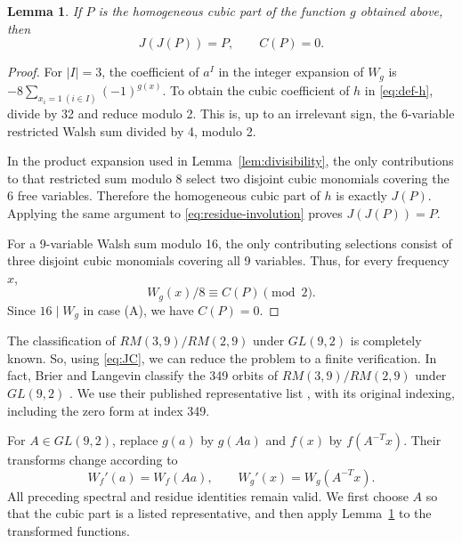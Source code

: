 \documentclass[11pt]{article}
\newtheorem{lemma}{Lemma}
\newtheorem{open problem}{Open problem}
\begin{document}
\begin{lemma}\label{lem:JC}
If $P$ is the homogeneous cubic part of the function $g$ obtained above, then
\begin{equation}\label{eq:JC}
J(J(P))=P,\qquad C(P)=0.
\end{equation}
\end{lemma}
\begin{proof}
For $|I|=3$, the coefficient of $a^I$ in the integer expansion of $W_g$ is $-8\sum_{x_i=1\ (i\in I)}(-1)^{g(x)}$. To obtain the cubic coefficient of $h$ in \eqref{eq:def-h}, divide by 32 and reduce modulo 2. This is, up to an irrelevant sign, the 6-variable restricted Walsh sum divided by 4, modulo 2.

In the product expansion used in Lemma~\ref{lem:divisibility}, the only contributions to that restricted sum modulo 8 select two disjoint cubic monomials covering the 6 free variables. Therefore the homogeneous cubic part of $h$ is exactly $J(P)$. Applying the same argument to \eqref{eq:residue-involution} proves $J(J(P))=P$.

For a 9-variable Walsh sum modulo 16, the only contributing selections consist of three disjoint cubic monomials covering all 9 variables. Thus, for every frequency $x$,
\begin{equation}\label{eq:C-residue}
W_g(x)/8\equiv C(P)\pmod2.
\end{equation}
Since $16\mid W_g$ in case (A), we have $C(P)=0$.
\end{proof}

The classification of $RM(3,9)/RM(2,9)$ under $GL(9,2)$ is completely known. So, using \eqref{eq:JC}, we can reduce the problem to a finite verification.
In fact, Brier and Langevin classify the 349 orbits of $RM(3,9)/RM(2,9)$
under $GL(9,2)$ \cite{BrierLangevin}. We use their published representative list \cite{ClassificationData}, with its original indexing, including the zero form at index 349.

 For $A\in GL(9,2)$, replace $g(a)$ by $g(Aa)$ and $f(x)$ by $f(A^{-T}x)$. Their transforms change according to
\begin{equation}\label{eq:linear-action}
W_f'(a)=W_f(Aa),\qquad W_g'(x)=W_g(A^{-T}x).
\end{equation}
All preceding spectral and residue identities remain valid. We first choose $A$ so that the cubic part is a listed representative, and then apply Lemma~\ref{lem:JC} to the transformed functions.
\end{document}
